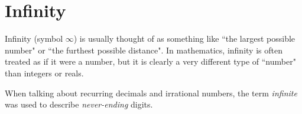     \section{Infinity}
            \nopagebreak
      \label{m38346*id180617}Infinity (symbol $\infty $) is usually thought of as something like ``the largest possible number" or ``the furthest possible distance". In mathematics, infinity is often treated as if it were a number, but it is clearly a very different type of ``number" than integers or reals.\par 
      \label{m38346*id180635}When talking about recurring decimals and irrational numbers, the term \textsl{infinite} was used to describe \textsl{never-ending} digits.\par 
